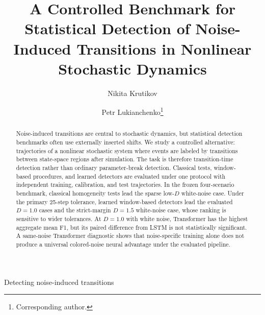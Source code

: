 \documentclass{ws-fnl}
\begin{document}
{Detecting noise-induced transitions}

\catchline{}{}{}{}{}

\title{A Controlled Benchmark for Statistical Detection of Noise-Induced
Transitions in Nonlinear Stochastic Dynamics}

\author{Nikita Krutikov}

\address{HSE University\\
Moscow, Russia}

\author{Petr Lukianchenko\footnote{Corresponding author.}}

\address{HSE University\\
Moscow, Russia\\
plukyanchenko@hse.ru}

\maketitle


\begin{abstract}
Noise-induced transitions are central to stochastic dynamics, but statistical
detection benchmarks often use externally inserted shifts. We study a
controlled alternative: trajectories of a nonlinear stochastic system where
events are labeled by transitions between state-space regions after simulation.
The task is therefore transition-time detection rather than ordinary
parameter-break detection. Classical tests, window-based procedures, and
learned detectors are evaluated under one protocol with independent training,
calibration, and test trajectories. In the frozen four-scenario benchmark,
classical homogeneity tests lead the sparse low-\(D\) white-noise case. Under
the primary 25-step tolerance, learned window-based detectors lead the evaluated
\(D=1.0\) cases and the strict-margin \(D=1.5\) white-noise case, whose ranking
is sensitive to wider tolerances. At \(D=1.0\) with white noise, Transformer has
the highest aggregate mean F1, but its paired difference from LSTM is not
statistically significant. A same-noise Transformer diagnostic shows that
noise-specific training alone does not produce a universal colored-noise neural
advantage under the evaluated pipeline.
\end{abstract}

\end{document}
